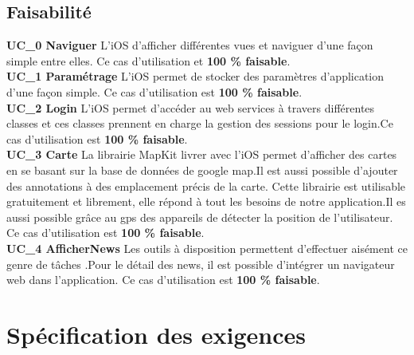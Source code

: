 	\subsection{Faisabilité}
		\textbf{UC\_0  Naviguer}  L'\gls{iOS} d'afficher différentes vues et naviguer d'une façon simple entre elles. Ce cas d'utilisation et \textbf{100 \%  faisable}.\\[0.2cm]
		\textbf{UC\_1  Paramétrage}  L'\gls{iOS} permet de stocker des paramètres d'application d'une façon simple. Ce cas d'utilisation est \textbf{100 \%  faisable}.\\[0.2cm]
		\textbf{UC\_2  Login}  L'\gls{iOS} permet d'accéder au web services à travers différentes classes et ces classes prennent en charge la gestion des sessions pour le login.Ce cas d'utilisation est \textbf{100 \%  faisable}.\\[0.2cm]
		\textbf{UC\_3  Carte}  La librairie MapKit livrer avec l'\gls{iOS} permet d'afficher des cartes en se basant sur la base de données de google map.Il est aussi possible d'ajouter des annotations à des emplacement précis de la carte. Cette librairie est utilisable gratuitement et librement, elle répond à tout les besoins de notre application.Il es aussi possible grâce au gps des appareils de détecter la position de l'utilisateur.  Ce cas d'utilisation est \textbf{100 \%  faisable}.\\[0.2cm]
		\textbf{UC\_4  AfficherNews}  Les outils à disposition permettent d'effectuer aisément ce genre de tâches  .Pour le détail des news, il est possible d'intégrer un navigateur web dans l'application. Ce cas d'utilisation est \textbf{100 \%  faisable}.\\[0.2cm]
\section{Spécification des exigences }
